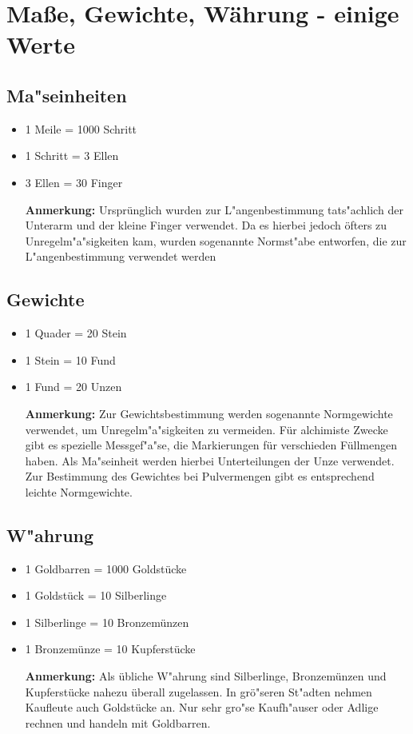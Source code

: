 \chapter{Maße, Gewichte, Währung - einige Werte}
\section{Ma"seinheiten}
\begin{itemize}
\item 1 Meile = 1000 Schritt
\item 1 Schritt = 3 Ellen
\item 3 Ellen = 30 Finger
\par \textbf{Anmerkung:} Ursprünglich wurden zur L"angenbestimmung tats"achlich der Unterarm und der
 kleine Finger verwendet. Da es hierbei jedoch öfters zu Unregelm"a"sigkeiten kam, wurden
 sogenannte Normst"abe entworfen, die zur L"angenbestimmung verwendet werden
\caption{Ma"seinheiten}
\end{itemize}

\section{Gewichte}
\begin{itemize}
\item 1 Quader = 20 Stein
\item 1 Stein = 10 Fund
\item 1 Fund = 20 Unzen
\par \textbf{Anmerkung:} Zur Gewichtsbestimmung werden sogenannte Normgewichte
 verwendet, um Unregelm"a"sigkeiten zu vermeiden. Für alchimiste Zwecke gibt es spezielle
 Messgef"a"se, die Markierungen für verschieden Füllmengen haben. Als Ma"seinheit
 werden hierbei Unterteilungen der Unze verwendet. Zur Bestimmung des Gewichtes bei Pulvermengen gibt es
 entsprechend leichte Normgewichte.
\caption{Gewichte}
\end{itemize}

\section{W"ahrung}
\begin{itemize}
\item 1 Goldbarren = 1000 Goldstücke
\item 1 Goldstück = 10 Silberlinge
\item 1 Silberlinge = 10 Bronzemünzen
\item 1 Bronzemünze = 10 Kupferstücke
\par \textbf{Anmerkung:} Als übliche W"ahrung sind Silberlinge, Bronzemünzen und Kupferstücke nahezu überall zugelassen. In grö"seren St"adten nehmen Kaufleute auch Goldstücke an. Nur sehr gro"se Kaufh"auser oder Adlige rechnen und handeln mit Goldbarren.
\caption{W"ahrung}
\end{itemize}

